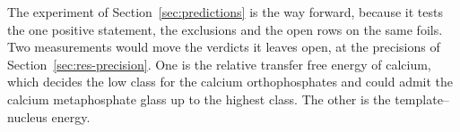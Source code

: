 The experiment of Section~\ref{sec:predictions} is the way forward, because it tests the one positive statement, the exclusions and the open rows on the same foils. %
Two measurements would move the verdicts it leaves open, at the precisions of Section~\ref{sec:res-precision}. %
One is the relative transfer free energy of calcium, which decides the low class for the calcium orthophosphates and could admit the calcium metaphosphate glass up to the highest class. %
The other is the template--nucleus energy. %
